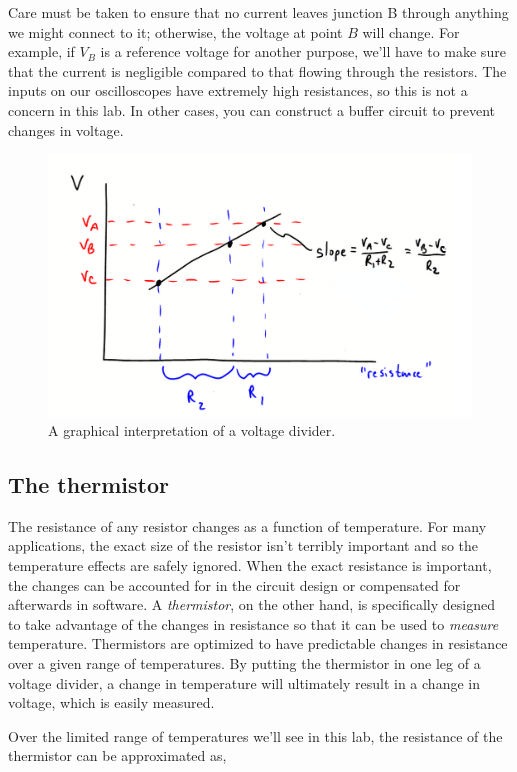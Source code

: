 \documentclass[11pt]{article} %
\begin{document}
Care must be taken to ensure that no current leaves junction B through anything we might connect to it; otherwise, the voltage at point $B$ will change. For example, if $V_B$ is a reference voltage for another purpose, we’ll have to make sure that the current is negligible compared to that flowing through the resistors. The inputs on our oscilloscopes have extremely high resistances, so this is not a concern in this lab. In other cases, you can construct a buffer circuit to prevent changes in voltage.
\begin{figure}
\centering
\includegraphics[width=4.5in]{figures/voltagegraph.png}
\caption{A graphical interpretation of a voltage divider.}
\label{fig:dividergraph}
\end{figure}

\subsection{The thermistor}

The resistance of any resistor changes as a function of temperature. For many applications, the exact size of the resistor isn’t terribly important and so the temperature effects are safely ignored. When the exact resistance is important, the changes can be accounted for in the circuit design or compensated for afterwards in software. A \emph{thermistor}, on the other hand, is specifically designed to take advantage of the changes in resistance so that it can be used to \emph{measure} temperature. Thermistors are optimized to have predictable changes in resistance over a given range of temperatures. By putting the thermistor in one leg of a voltage divider, a change in temperature will ultimately result in a change in voltage, which is easily measured.

Over the limited range of temperatures we’ll see in this lab, the resistance of the thermistor can be approximated as,
\end{document}
